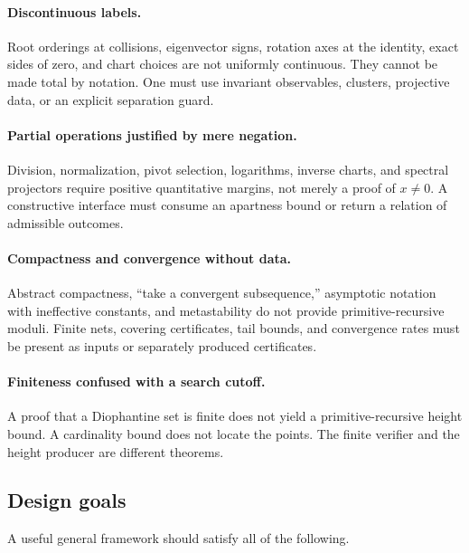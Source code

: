 \paragraph{Discontinuous labels.}
Root orderings at collisions, eigenvector signs, rotation axes at the identity, exact sides of zero, and chart choices are not uniformly continuous.  They cannot be made total by notation.  One must use invariant observables, clusters, projective data, or an explicit separation guard.

\paragraph{Partial operations justified by mere negation.}
Division, normalization, pivot selection, logarithms, inverse charts, and spectral projectors require positive quantitative margins, not merely a proof of \(x\neq 0\).  A constructive interface must consume an apartness bound or return a relation of admissible outcomes.

\paragraph{Compactness and convergence without data.}
Abstract compactness, ``take a convergent subsequence,'' asymptotic notation with ineffective constants, and metastability do not provide primitive-recursive moduli.  Finite nets, covering certificates, tail bounds, and convergence rates must be present as inputs or separately produced certificates.

\paragraph{Finiteness confused with a search cutoff.}
A proof that a Diophantine set is finite does not yield a primitive-recursive height bound.  A cardinality bound does not locate the points.  The finite verifier and the height producer are different theorems.

\subsection{Design goals}

A useful general framework should satisfy all of the following.

